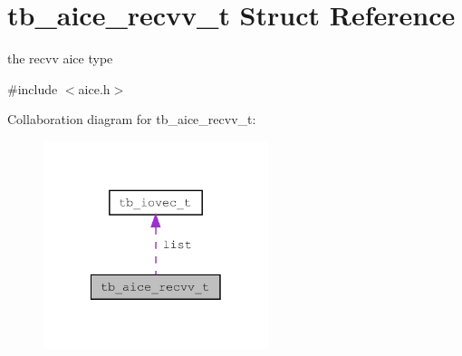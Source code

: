 \hypertarget{structtb__aice__recvv__t}{\section{tb\-\_\-aice\-\_\-recvv\-\_\-t Struct Reference}
\label{structtb__aice__recvv__t}
}


the recvv aice type  




{\ttfamily \#include $<$aice.\-h$>$}



Collaboration diagram for tb\-\_\-aice\-\_\-recvv\-\_\-t\-:\nopagebreak
\begin{figure}[H]
\begin{center}
\leavevmode
\includegraphics[width=186pt]{db/d19/structtb__aice__recvv__t__coll__graph}
\end{center}
\end{figure}
